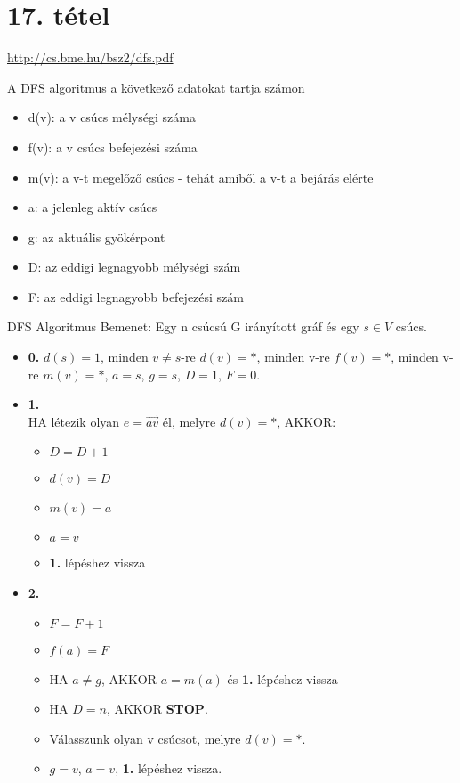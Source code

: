 \section{17. tétel}

\url{http://cs.bme.hu/bsz2/dfs.pdf}

\begin{tetel}{A DFS algoritmus a következő adatokat tartja számon}
\begin{itemize}
\item d(v): a v csúcs mélységi száma
\item f(v): a v csúcs befejezési száma
\item m(v): a v-t megelőző csúcs - tehát amiből a v-t a bejárás elérte
\item a: a jelenleg aktív csúcs
\item g: az aktuális gyökérpont
\item D: az eddigi legnagyobb mélységi szám
\item F: az eddigi legnagyobb befejezési szám
\end{itemize}
\end{tetel}

\begin{tetel}{DFS Algoritmus}
Bemenet: Egy n csúcsú G irányított gráf és egy $s \in V$ csúcs.
\begin{itemize}
\item{\textbf{0.}} $d(s) = 1$, minden $v \neq s$-re $d(v) = *$, minden v-re $f(v) = *$, minden v-re $m(v) = *$, $a = s$, $g = s$, $D = 1$, $F = 0$.
\item{\textbf{1.}}
\\
HA létezik olyan $e = \overrightarrow{av}$ él, melyre $d(v) = *$, AKKOR:
	\begin{itemize}
	\item $D = D + 1$
	\item $d(v) = D$
	\item $m(v) = a$
	\item $a = v$
	\item \textbf{1.} lépéshez vissza
	\end{itemize}
\item{\textbf{2.}}
	\begin{itemize}
	\item $F = F + 1$
	\item $f(a) = F$
	\item HA $a \neq g$, AKKOR $a = m(a)$ és \textbf{1.} lépéshez vissza
	\item HA $D = n$, AKKOR \textbf{STOP}.
	\item Válasszunk olyan v csúcsot, melyre $d(v) = *$.
	\item $g = v$, $a = v$, \textbf{1.} lépéshez vissza.
	\end{itemize}
\end{itemize}
\end{tetel}

